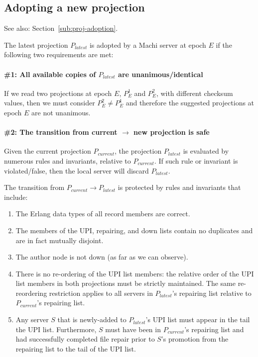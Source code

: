 \documentclass[preprint,10pt]{sigplanconf}
\begin{document}
\subsection{Adopting a new projection}
\label{sub:humming-proj-adoption}

See also: Section~\ref{sub:proj-adoption}.

The latest projection $P_{latest}$ is adopted by a Machi server at epoch $E$ if
the following two requirements are met:

\paragraph{\#1: All available copies of $P_{latest}$ are unanimous/identical}

If we read two projections at epoch $E$, $P^1_E$ and $P^2_E$, with
different checksum values, then we must consider $P^2_E \ne P^1_E$ and
therefore the suggested projections at epoch $E$ are not unanimous.

\paragraph{\#2: The transition from current $\rightarrow$ new projection is
safe}

Given the current projection
$P_{current}$, the projection $P_{latest}$ is evaluated by numerous
rules and invariants, relative to $P_{current}$.
If such rule or invariant is
violated/false, then the local server will discard $P_{latest}$.

The transition from $P_{current} \rightarrow P_{latest}$ is protected
by rules and invariants that include:

\begin{enumerate}
\item The Erlang data types of all record members are correct.
\item The members of the UPI, repairing, and down lists contain no
  duplicates and are in fact mutually disjoint.
\item The author node is not down (as far as we can observe).
\item There is no re-ordering of the UPI list members: the relative
  order of the UPI list members in both projections must be strictly
  maintained.
  The same re-reordering restriction applies to all
  servers in $P_{latest}$'s repairing list relative to
  $P_{current}$'s repairing list.
\item Any server $S$ that is newly-added to $P_{latest}$'s UPI list must
  appear in the tail the UPI list.  Furthermore, $S$ must have been in
  $P_{current}$'s repairing list and had successfully completed file
  repair prior to $S$'s promotion from the repairing list to the tail
  of the UPI list.
\end{enumerate}
\end{document}
